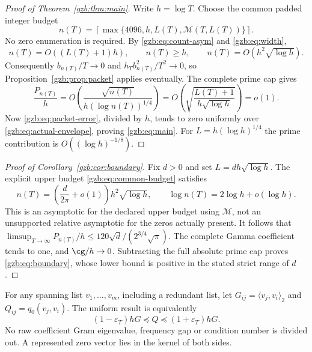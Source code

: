 \documentclass[11pt,a4paper]{article}
\numberwithin{equation}{section}
\theoremstyle{definition}\newtheorem{definition}[theorem]{Definition}
\theoremstyle{remark}\newtheorem{remark}[theorem]{Remark}
\newcommand{\ip}[2]{\langle#1,#2\rangle}\newcommand{\norm}[1]{\lVert#1\rVert}\newcommand{\abs}[1]{\lvert#1\rvert}
\begin{document}
\begin{proof}[Proof of Theorem~\ref{gzb:thm:main}]
Write $h=\log T$. Choose the common padded integer budget
\begin{equation}\label{gzb:eq:common-budget}
 n(T)=\left\lceil\max\{4096,h,L(T),\mathcal M(T,L(T))\}\right\rceil.
\end{equation}
No zero enumeration is required.
By \eqref{gzb:eq:count-asym} and \eqref{gzb:eq:width},
\[
 n(T)=O((L(T)+1)h),\qquad n(T)\ge h,\qquad
 n(T)=O(h^2\sqrt{\log h}).
\]
Consequently $b_{n(T)}/T\to0$ and $h_Tb_{n(T)}^2/T^2\to0$,
so Proposition~\ref{gzb:prop:packet} applies eventually.
The complete prime cap gives
\begin{equation}\label{gzb:eq:relative-prime}
 \frac{P_{n(T)}}h
 =O\left(\frac{\sqrt{n(T)}}{h(\log n(T))^{1/4}}\right)
 =O\left(\sqrt{\frac{L(T)+1}{h\sqrt{\log h}}}\right)=o(1).
\end{equation}
Now \eqref{gzb:eq:packet-error}, divided by $h$, tends to zero uniformly
over \eqref{gzb:eq:actual-envelope}, proving \eqref{gzb:eq:main}.
For $L=h(\log h)^{1/4}$ the prime contribution is
$O((\log h)^{-1/8})$.
\end{proof}

\begin{proof}[Proof of Corollary~\ref{gzb:cor:boundary}]
Fix $d>0$ and set $L=dh\sqrt{\log h}$.
The explicit upper budget \eqref{gzb:eq:common-budget} satisfies
\[
 n(T)=\left(\frac d{2\pi}+o(1)\right)h^2\sqrt{\log h},
 \qquad\log n(T)=2\log h+o(\log h).
\]
This is an asymptotic for the declared upper budget using $\mathcal M$,
not an unsupported relative asymptotic for the zeros actually present.
It follows that
$\limsup_{T\to\infty}P_{n(T)}/h
 \le120\sqrt d/(2^{3/4}\sqrt\pi)$.
The complete Gamma coefficient tends to one, and $\cg/h\to0$.
Subtracting the full absolute prime cap proves \eqref{gzb:eq:boundary},
whose lower bound is positive in the stated strict range of $d$.
\end{proof}

For any spanning list $v_1,\ldots,v_m$, including a redundant list,
let $G_{ij}=\ip{v_j}{v_i}_2$ and $Q_{ij}=q_0(v_j,v_i)$.
The uniform result is equivalently
\[
 (1-\varepsilon_T)hG\preceq Q\preceq(1+\varepsilon_T)hG.
\]
No raw coefficient Gram eigenvalue, frequency gap or condition number
is divided out. A represented zero vector lies in the kernel of both sides.
\end{document}
